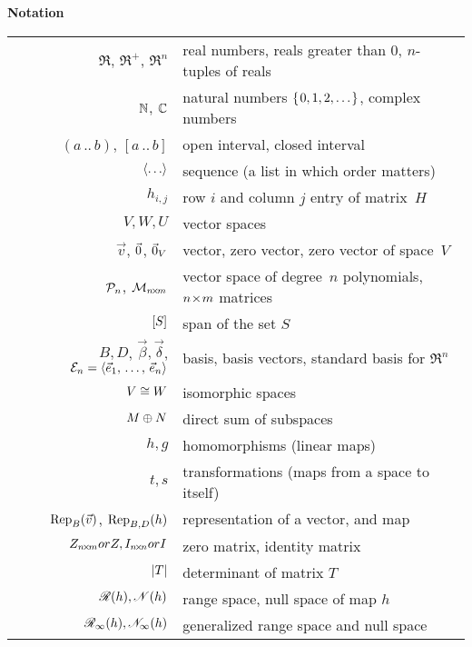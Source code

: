 %

%
%
\thispagestyle{empty}
\begin{center}
  \textbf{Notation}  \\[2ex]
  \begin{tabular}{r|l}
    \( \Re \), \( \Re^+ \), \( \Re^n \) &real numbers, reals greater than $0$, $n$-tuples of reals \\
    \( \N              \),
    \( \C              \)  &natural numbers \( \set{0,1,2,\ldots} \), complex numbers                           \\
    \( (a\,..\,b) \), \( [a\,..\,b] \) &open interval, closed interval   \\
    \( \sequence{\ldots} \)&sequence (a list in which order matters)    \\
    \( h_{i,j} \)          &row \( i \) and column \( j \) entry of matrix~$H$ \\
    \( V,W,U \)            &vector spaces               \\
    \( \vec{v} \),
    $\zero$, $\zero_V$     &vector, zero vector, zero vector of space~$V$   \\
    \( \polyspace_n \), \( \matspace_{\nbym{n}{m}} \)  
                          &vector space of degree~\( n \) polynomials, \( \nbym{n}{m} \) matrices      \\
    \( \spanof{S} \)       &span of the set \( S \)                   \\
    \( B,D \), \( \vec{\beta},\vec{\delta} \), \( \stdbasis_n=\sequence{\vec{e}_1,\,\ldots,\,\vec{e}_n} \)         
                          &basis, basis vectors, standard basis for $\Re^n$  \\
    \( V\isomorphicto W \) &isomorphic spaces                         \\
    \( M\directsum N \)    &direct sum of subspaces                   \\
    \( h,g \)              &homomorphisms (linear maps)                \\
    \( t,s \)              &transformations (maps from a space to itself) \\
    \( \rep{\vec{v}}{B} \), \( \rep{h}{B,D} \)     
                          &representation of a vector, and map    \\
    \( Z_{\nbym{n}{m}} or Z,I_{\nbyn{n}} or I \)  &zero matrix, identity matrix    \\
    \( \deter{T} \)        &determinant of matrix \( T \)         \\
    \( \rangespace{h},\nullspace{h} \)
                           &range space,  null space of map \( h \) \\
    \( \genrangespace{h},\gennullspace{h} \)
                           &generalized range space and null space
  \end{tabular}
\end{center}
